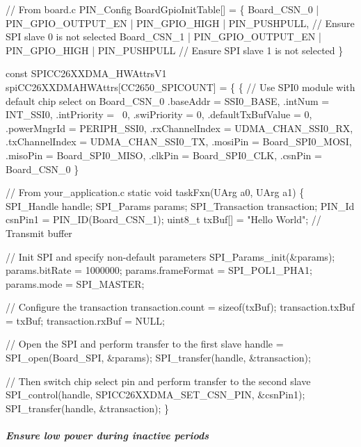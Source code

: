 \begin{DoxyCode}
\textcolor{comment}{// From board.c}
PIN_Config BoardGpioInitTable[] = \{
    Board\_CSN\_0   | PIN_GPIO_OUTPUT_EN | PIN_GPIO_HIGH   | PIN_PUSHPULL,   \textcolor{comment}{// Ensure SPI slave 0 is not
       selected}
    Board\_CSN\_1   | PIN_GPIO_OUTPUT_EN | PIN_GPIO_HIGH   | PIN_PUSHPULL    \textcolor{comment}{// Ensure SPI slave 1 is not
       selected}
\}

\textcolor{keyword}{const} SPICC26XXDMA_HWAttrsV1 spiCC26XXDMAHWAttrs[CC2650\_SPICOUNT] = \{
\{   \textcolor{comment}{// Use SPI0 module with default chip select on Board\_CSN\_0}
    .baseAddr = SSI0\_BASE,
    .intNum = INT\_SSI0,
    .intPriority = ~0,
    .swiPriority = 0,
    .defaultTxBufValue = 0,
    .powerMngrId = PERIPH\_SSI0,
    .rxChannelIndex = UDMA\_CHAN\_SSI0\_RX,
    .txChannelIndex = UDMA\_CHAN\_SSI0\_TX,
    .mosiPin = Board\_SPI0\_MOSI,
    .misoPin = Board\_SPI0\_MISO,
    .clkPin = Board\_SPI0\_CLK,
    .csnPin = Board\_CSN\_0
\}

\textcolor{comment}{// From your\_application.c}
\textcolor{keyword}{static} \textcolor{keywordtype}{void} taskFxn(UArg a0, UArg a1)
\{
    SPI_Handle handle;
    SPI_Params params;
    SPI_Transaction transaction;
    PIN_Id csnPin1  = PIN_ID(Board\_CSN\_1);
    uint8\_t txBuf[] = \textcolor{stringliteral}{"Hello World"};    \textcolor{comment}{// Transmit buffer}

    \textcolor{comment}{// Init SPI and specify non-default parameters}
    SPI_Params_init(&params);
    params.bitRate     = 1000000;
    params.frameFormat = SPI_POL1_PHA1;
    params.mode        = SPI_MASTER;

    \textcolor{comment}{// Configure the transaction}
    transaction.count = \textcolor{keyword}{sizeof}(txBuf);
    transaction.txBuf = txBuf;
    transaction.rxBuf = NULL;

    \textcolor{comment}{// Open the SPI and perform transfer to the first slave}
    handle = SPI_open(Board\_SPI, &params);
    SPI_transfer(handle, &transaction);

    \textcolor{comment}{// Then switch chip select pin and perform transfer to the second slave}
    SPI_control(handle, SPICC26XXDMA_SET_CSN_PIN, &csnPin1);
    SPI_transfer(handle, &transaction);
\}
\end{DoxyCode}


\subparagraph*{Ensure low power during inactive periods\label{_s_p_i_c_c26_x_x_d_m_a_8h_USE_CASE_LPWR}%
\hypertarget{_s_p_i_c_c26_x_x_d_m_a_8h_USE_CASE_LPWR}{}%
}

